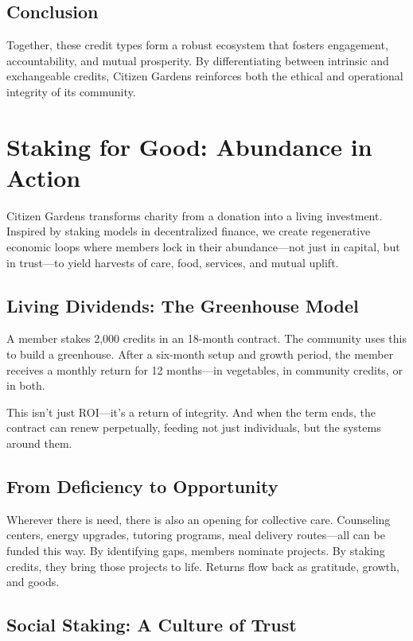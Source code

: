 \documentclass[12pt]{article}
\begin{document}
\subsection{Conclusion}
Together, these credit types form a robust ecosystem that fosters engagement, accountability, and mutual prosperity. By differentiating between intrinsic and exchangeable credits, Citizen Gardens reinforces both the ethical and operational integrity of its community.

\section{Staking for Good: Abundance in Action}

Citizen Gardens transforms charity from a donation into a living investment. Inspired by staking models in decentralized finance, we create regenerative economic loops where members lock in their abundance—not just in capital, but in trust—to yield harvests of care, food, services, and mutual uplift.

\subsection{Living Dividends: The Greenhouse Model}

A member stakes 2,000 credits in an 18-month contract. The community uses this to build a greenhouse. After a six-month setup and growth period, the member receives a monthly return for 12 months—in vegetables, in community credits, or in both.

This isn't just ROI—it's a return of integrity. And when the term ends, the contract can renew perpetually, feeding not just individuals, but the systems around them.

\subsection{From Deficiency to Opportunity}

Wherever there is need, there is also an opening for collective care. Counseling centers, energy upgrades, tutoring programs, meal delivery routes—all can be funded this way. By identifying gaps, members nominate projects. By staking credits, they bring those projects to life. Returns flow back as gratitude, growth, and goods.

\subsection{Social Staking: A Culture of Trust}
\end{document}
